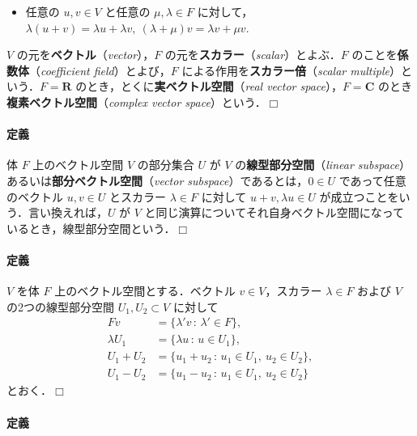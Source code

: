 \documentclass[10pt,b5paper,pandoc]{bxjsarticle}
\providecommand{\tightlist}{%
  \setlength{\itemsep}{0pt}\setlength{\parskip}{0pt}}
\let\oldparagraph\paragraph
\renewcommand{\paragraph}[1]{\oldparagraph{#1}\mbox{}}
\begin{document}
\begin{itemize}
\tightlist
\item
  任意の \(u, v \in V\) と任意の \(\mu, \lambda \in F\)
  に対して，\(\lambda (u + v) = \lambda u + \lambda v,\ (\lambda + \mu) v = \lambda v + \mu v\).
\end{itemize}

\(V\) の元を\textbf{ベクトル}（\emph{vector}），\(F\)
の元を\textbf{スカラー}（\emph{scalar}）とよぶ．\(F\)
のことを\textbf{係数体}（\emph{coefficient field}）とよび，\(F\)
による作用を\textbf{スカラー倍}（\emph{scalar
multiple}）という．\(F = \boldsymbol R\)
のとき，とくに\textbf{実ベクトル空間}（\emph{real vector
space}），\(F = \boldsymbol C\)
のとき\textbf{複素ベクトル空間}（\emph{complex vector
space}）という．\(\Box\)

\hypertarget{linear-subspace}{%
\paragraph{定義}\label{linear-subspace}}

体 \(F\) 上のベクトル空間 \(V\) の部分集合 \(U\) が \(V\)
の\textbf{線型部分空間}（\emph{linear
subspace}）あるいは\textbf{部分ベクトル空間}（\emph{vector
subspace}）であるとは，\(0 \in U\) であって任意のベクトル \(u, v \in U\)
とスカラー \(\lambda \in F\) に対して \(u + v, \lambda u \in U\)
が成立つことをいう．言い換えれば，\(U\) が \(V\)
と同じ演算についてそれ自身ベクトル空間になっているとき，線型部分空間という．\(\Box\)

\hypertarget{operation-of-spaces}{%
\paragraph{定義}\label{operation-of-spaces}}

\(V\) を体 \(F\) 上のベクトル空間とする．ベクトル \(v \in V\)，スカラー
\(\lambda \in F\) および \(V\) の2つの線型部分空間
\(U_1, U_2 \subset V\) に対して \begin{align*}
Fv &= \{ \lambda' v \,:\,\lambda' \in F \},\\
\lambda U_1 &= \{ \lambda u \,:\,u \in U_1 \},\\
U_1 + U_2 &= \{ u_1 + u_2 \,:\,u_1 \in U_1,\ u_2 \in U_2 \},\\
U_1 - U_2 &= \{ u_1 - u_2 \,:\,u_1 \in U_1,\ u_2 \in U_2 \}
\end{align*} とおく．\(\Box\)

\hypertarget{linear-independence}{%
\paragraph{定義}\label{linear-independence}}
\end{document}

